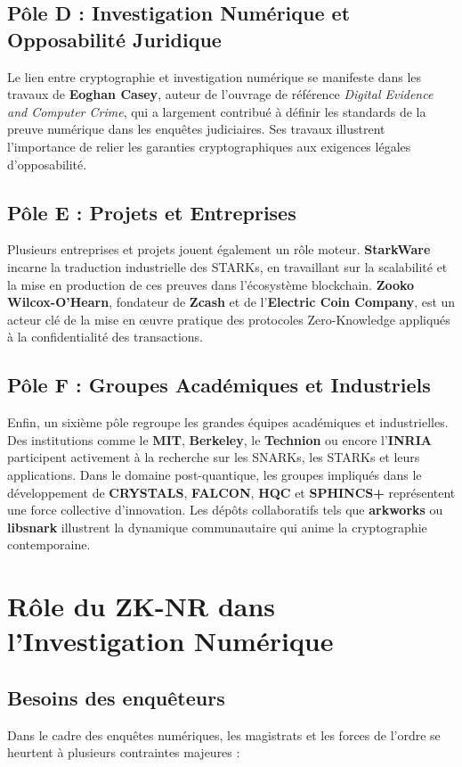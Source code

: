 \documentclass[11pt]{article}
\begin{document}
\subsection{Pôle D : Investigation Numérique et Opposabilité Juridique}
Le lien entre cryptographie et investigation numérique se manifeste dans les travaux de \textbf{Eoghan Casey}, auteur de l’ouvrage de référence \textit{Digital Evidence and Computer Crime}, qui a largement contribué à définir les standards de la preuve numérique dans les enquêtes judiciaires. Ses travaux illustrent l’importance de relier les garanties cryptographiques aux exigences légales d’opposabilité.  

\subsection{Pôle E : Projets et Entreprises}
Plusieurs entreprises et projets jouent également un rôle moteur. \textbf{StarkWare} incarne la traduction industrielle des STARKs, en travaillant sur la scalabilité et la mise en production de ces preuves dans l’écosystème blockchain. \textbf{Zooko Wilcox-O’Hearn}, fondateur de \textbf{Zcash} et de l’\textbf{Electric Coin Company}, est un acteur clé de la mise en œuvre pratique des protocoles Zero-Knowledge appliqués à la confidentialité des transactions.  

\subsection{Pôle F : Groupes Académiques et Industriels}
Enfin, un sixième pôle regroupe les grandes équipes académiques et industrielles. Des institutions comme le \textbf{MIT}, \textbf{Berkeley}, le \textbf{Technion} ou encore l’\textbf{INRIA} participent activement à la recherche sur les SNARKs, les STARKs et leurs applications. Dans le domaine post-quantique, les groupes impliqués dans le développement de \textbf{CRYSTALS}, \textbf{FALCON}, \textbf{HQC} et \textbf{SPHINCS+} représentent une force collective d’innovation. Les dépôts collaboratifs tels que \textbf{arkworks} ou \textbf{libsnark} illustrent la dynamique communautaire qui anime la cryptographie contemporaine.  


\newpage
\section{Rôle du ZK-NR dans l'Investigation Numérique}
\subsection{Besoins des enquêteurs}
Dans le cadre des enquêtes numériques, les magistrats et les forces de l’ordre se heurtent à plusieurs contraintes majeures :
\end{document}
